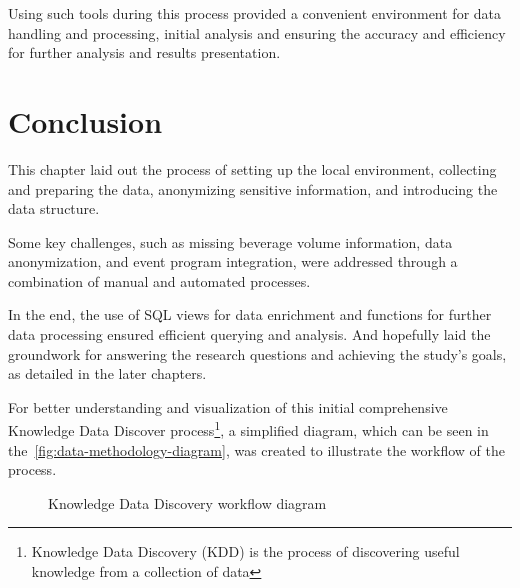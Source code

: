 Using such tools during this process provided a convenient environment for data handling and processing, initial analysis and ensuring the accuracy and efficiency for further analysis and results presentation.


\section{Conclusion}
\label{sec:data-methodology-conclusion}
This chapter laid out the process of setting up the local environment, collecting and preparing the data, anonymizing sensitive information, and introducing the data structure.

Some key challenges, such as missing beverage volume information, data anonymization, and event program integration, were addressed through a combination of manual and automated processes.

In the end, the use of SQL views for data enrichment and functions for further data processing ensured efficient querying and analysis.
And hopefully laid the groundwork for answering the research questions and achieving the study's goals, as detailed in the later chapters.

For better understanding and visualization of this initial comprehensive Knowledge Data Discover process\footnote{Knowledge Data Discovery (KDD) is the process of discovering useful knowledge from a collection of data\cite{uord_kdd_1_kdd}}, a simplified diagram, which can be seen in the~\autoref{fig:data-methodology-diagram}, was created to illustrate the workflow of the process.

\begin{figure}[h]
	\centering
	
	\caption{Knowledge Data Discovery workflow diagram}
	\label{fig:data-methodology-diagram}
\end{figure}
